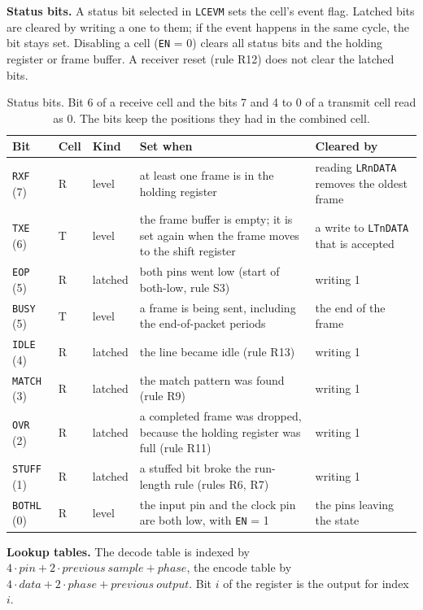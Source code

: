 \documentclass[10pt,a4paper]{article}
\newcommand{\reg}[1]{\texttt{#1}}
\begin{document}
\textbf{Status bits.} A status bit selected in \reg{LCEVM} sets the cell's event flag. Latched bits are cleared by
writing a one to them; if the event happens in the same cycle, the bit stays set. Disabling a cell
(\reg{EN} = 0) clears all status bits and the holding register or frame buffer. A receiver reset (rule R12) does
not clear the latched bits.

\begin{table}[H]
\centering\small
\begin{tabularx}{\linewidth}{@{}lllL>{\raggedright\arraybackslash}p{34mm}@{}}
\toprule
Bit & Cell & Kind & Set when & Cleared by \\
\midrule
\reg{RXF} (7) & R & level & at least one frame is in the holding register & reading \reg{LRnDATA} removes the oldest frame \\
\reg{TXE} (6) & T & level & the frame buffer is empty; it is set again when the frame moves to the shift register & a write to \reg{LTnDATA} that is accepted \\
\reg{EOP} (5) & R & latched & both pins went low (start of both-low, rule S3) & writing 1 \\
\reg{BUSY} (5) & T & level & a frame is being sent, including the end-of-packet periods & the end of the frame \\
\reg{IDLE} (4) & R & latched & the line became idle (rule R13) & writing 1 \\
\reg{MATCH} (3) & R & latched & the match pattern was found (rule R9) & writing 1 \\
\reg{OVR} (2) & R & latched & a completed frame was dropped, because the holding register was full (rule R11) & writing 1 \\
\reg{STUFF} (1) & R & latched & a stuffed bit broke the run-length rule (rules R6, R7) & writing 1 \\
\reg{BOTHL} (0) & R & level & the input pin and the clock pin are both low, with \reg{EN} = 1 & the pins leaving the state \\
\bottomrule
\end{tabularx}
\caption{Status bits. Bit 6 of a receive cell and the bits 7 and 4 to 0 of a transmit cell read as 0. The bits keep the
positions they had in the combined cell.}
\end{table}

\textbf{Lookup tables.} The decode table is indexed by $4\cdot\mathit{pin} + 2\cdot\mathit{previous\ sample} +
\mathit{phase}$, the encode table by $4\cdot\mathit{data} + 2\cdot\mathit{phase} + \mathit{previous\ output}$.
Bit $i$ of the register is the output for index $i$.
\end{document}
